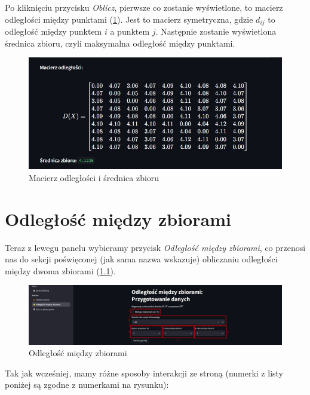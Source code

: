 \documentclass[article,11pt]{mwrep}
\begin{document}
Po kliknięciu przycisku \textit{Oblicz}, pierwsze co zostanie wyświetlone, to macierz odległości między punktami (\ref{rys:mo}). Jest to macierz symetryczna, gdzie $d_{ij}$ to odległość między punktem $i$ a punktem $j$. Następnie zostanie wyświetlona średnica zbioru, czyli maksymalna odległość między punktami.

\begin{figure}[H] 
    \centering
    \includegraphics[width=1\textwidth]{figure/Screenshot_4.jpg}
    \caption{Macierz odległości i średnica zbioru}\label{rys:mo}
\end{figure}

\chapter{Odległość między zbiorami}

Teraz z lewegu panelu wybieramy przycisk \textit{Odległość między zbiorami}, co przenosi nas do sekcji poświęconej (jak sama nazwa wskazuje) obliczaniu odległości między dwoma zbiorami (\ref{rys:omz}). 

\begin{figure}[H] 
    \centering
    \includegraphics[width=1\textwidth]{figure/Screenshot_5.jpg}
    \caption{Odległość między zbiorami}\label{rys:omz}
\end{figure}

Tak jak wcześniej, mamy różne sposoby interakcji ze stroną (numerki z listy poniżej są zgodne z numerkami na rysunku):
\end{document}
